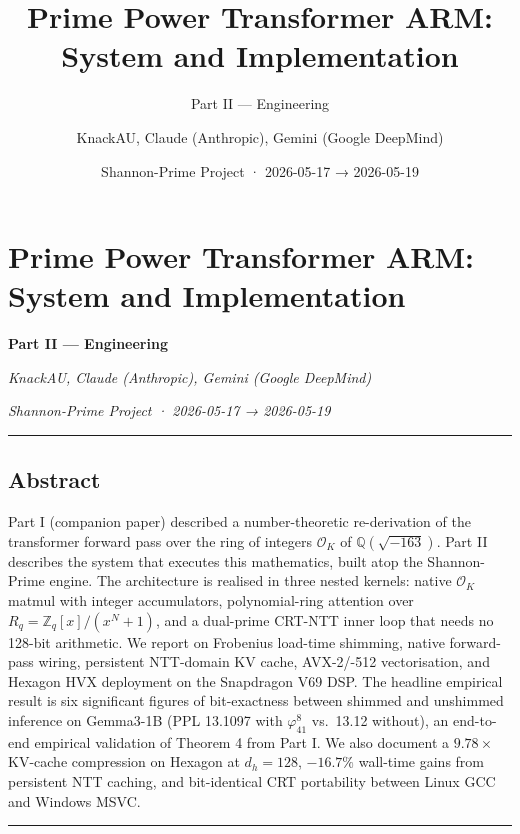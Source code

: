 \documentclass[
  11pt,
]{article}
\title{Prime Power Transformer ARM: System and Implementation}
\subtitle{Part II --- Engineering}
\author{KnackAU, Claude (Anthropic), Gemini (Google DeepMind)}
\date{Shannon-Prime Project · 2026-05-17 → 2026-05-19}
\begin{document}
\maketitle

\hypertarget{prime-power-transformer-arm-system-and-implementation}{%
\section{Prime Power Transformer ARM: System and
Implementation}\label{prime-power-transformer-arm-system-and-implementation}}

\textbf{Part II --- Engineering}

\emph{KnackAU, Claude (Anthropic), Gemini (Google DeepMind)}

\emph{Shannon-Prime Project · 2026-05-17 → 2026-05-19}

\begin{center}\rule{0.5\linewidth}{0.5pt}\end{center}

\hypertarget{abstract}{%
\subsection{Abstract}\label{abstract}}

Part I (companion paper) described a number-theoretic re-derivation of
the transformer forward pass over the ring of integers \(\mathcal{O}_K\)
of \(\mathbb{Q}(\sqrt{-163})\). Part II describes the system that
executes this mathematics, built atop the Shannon-Prime engine. The
architecture is realised in three nested kernels: native
\(\mathcal{O}_K\) matmul with integer accumulators, polynomial-ring
attention over \(R_q = \mathbb{Z}_q[x]/(x^N+1)\), and a dual-prime
CRT-NTT inner loop that needs no 128-bit arithmetic. We report on
Frobenius load-time shimming, native forward-pass wiring, persistent
NTT-domain KV cache, AVX-2/-512 vectorisation, and Hexagon HVX
deployment on the Snapdragon V69 DSP. The headline empirical result is
six significant figures of bit-exactness between shimmed and unshimmed
inference on Gemma3-1B (PPL 13.1097 with \(\varphi_{41}^8\) vs.~13.12
without), an end-to-end empirical validation of Theorem 4 from Part I.
We also document a \(9.78\times\) KV-cache compression on Hexagon at
\(d_h=128\), \(-16.7\%\) wall-time gains from persistent NTT caching,
and bit-identical CRT portability between Linux GCC and Windows MSVC.

\begin{center}\rule{0.5\linewidth}{0.5pt}\end{center}
\end{document}
